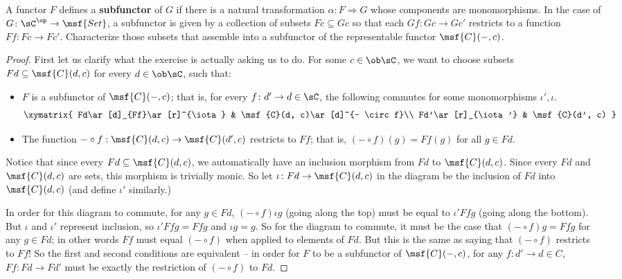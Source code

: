 \documentclass[main,tex]{subfiles}
\begin{document}
\paragraph{}
\begin{exercise}
	A functor \(F\) defines a \textbf{subfunctor} of \(G\) if there is a
	natural transformation \(\alpha \colon F \Rightarrow G \) whose
	components are monomorphisms. In the case of \(G \colon \sC^{\op} \to
	\msf{Set}\), a subfunctor is given by a collection of subsets \(Fc
	\subseteq Gc\) so that each \(Gf \colon Gc \to Gc'\) restricts to a
	function \(Ff \colon Fc \to Fc'\). Characterize those subsets that
	assemble into a subfunctor of the representable functor
	\(\msf{C}(-,c)\).
\end{exercise}
\begin{proof}
	First let us clarify what the exercise is actually
	asking us to do. For some \(c \in \ob\sC\), we want to choose subsets
	\(Fd \subseteq \msf{C}(d,c)\) for every \(d \in \ob\sC\), such that:
	\begin{itemize}
		\item \(F\) is a subfunctor of \(\msf{C}(-,c)\); that is, for every \(f \colon d' \to d \in \sC\), the following commutes for some monomorphisms \(\iota', \iota\).
			$$
			\xymatrix{
				Fd\ar[d]_{Ff}\ar[r]^{\iota} & \msf{C}(d, c)\ar[d]^{- \circ f}\\
				Fd'\ar[r]_{\iota'} & \msf{C}(d', c)
			}
			$$
		\item The function \(- \circ f: \msf{C}(d, c) \to \msf{C}(d', c)\) restricts to \(Ff\); that is, \((- \circ f)(g) = Ff(g)\) for all \(g \in Fd\).

	\end{itemize}
	Notice that since every \(Fd \subseteq \msf{C}(d,c)\), we automatically
	have an inclusion morphism from \(Fd\) to \(\msf{C}(d,c)\). Since every
	\(Fd\) and \(\msf{C}(d,c)\) are sets, this morphism is trivially monic.
	So let \(\iota \colon Fd \to \msf{C}(d,c)\) in the diagram be the
	inclusion of \(Fd\) into \(\msf{C}(d,c)\) (and define \(\iota'\)
	similarly.)

	In order for this diagram to commute, for any \(g \in Fd\), \((- \circ
	f)\iota g\) (going along the top) must be equal to \(\iota'Ffg\) (going
	along the bottom). But \(\iota\) and \(\iota'\) represent inclusion, so
	\(\iota' Ffg = Ffg\) and \(\iota g = g\). So for the diagram to
	commute, it must be the case that \((- \circ f)g = Ffg\) for any \(g
	\in Fd\); in other words \(Ff\) must equal \((- \circ f)\) when applied
	to elements of \(Fd\). But this is the same as saying that \((- \circ
	f)\) restricts to \(Ff\)! So the first and second conditions are
	equivalent -- in order for \(F\) to be a subfunctor of
	\(\msf{C}(-,c)\), for any \(f \colon d' \to d \in C\), \(Ff \colon Fd
	\to Fd'\) must be exactly the restriction of \((- \circ f)\) to \(Fd\).


\end{proof}
\end{document}
